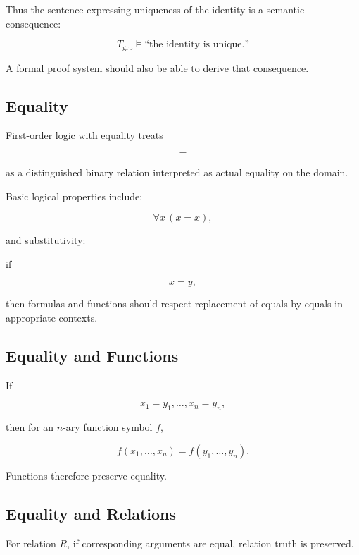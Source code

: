 Thus the sentence expressing uniqueness of the identity is a semantic
consequence:

\[
\boxed{
T_{\mathrm{grp}}
\models
\text{``the identity is unique.''}
}
\]

A formal proof system should also be able to derive that consequence.

\subsection{Equality}
\label{subsec:first-order-equality}

First-order logic with equality treats

\[
=
\]

as a distinguished binary relation interpreted as actual equality on the
domain.

Basic logical properties include:

\[
\boxed{
\forall x\,(x=x),
}
\]

and substitutivity:

if

\[
x=y,
\]

then formulas and functions should respect replacement of equals by equals
in appropriate contexts.

\subsection{Equality and Functions}
\label{subsec:equality-functions}

If

\[
x_1=y_1,
\ldots,
x_n=y_n,
\]

then for an \(n\)-ary function symbol \(f\),

\[
\boxed{
f(x_1,\ldots,x_n)
=
f(y_1,\ldots,y_n).
}
\]

Functions therefore preserve equality.

\subsection{Equality and Relations}
\label{subsec:equality-relations}

For relation \(R\), if corresponding arguments are equal, relation truth is
preserved.

